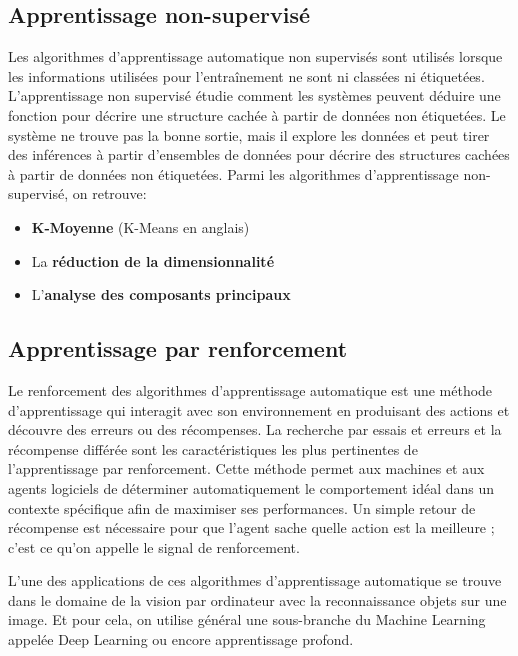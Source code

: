     \subsection{Apprentissage non-supervisé}
    Les algorithmes d'apprentissage automatique non supervisés sont utilisés lorsque les informations utilisées pour l'entraînement ne sont ni classées ni étiquetées. L'apprentissage non supervisé étudie comment les systèmes peuvent déduire une fonction pour décrire une structure cachée à partir de données non étiquetées. Le système ne trouve pas la bonne sortie, mais il explore les données et peut tirer des inférences à partir d'ensembles de données pour décrire des structures cachées à partir de données non étiquetées.\cite{expertAi}
    Parmi les algorithmes d'apprentissage non-supervisé, on retrouve:
        \begin{itemize}
            \item \textbf{K-Moyenne} (K-Means en anglais)
            \item La \textbf{réduction de la dimensionnalité}
            \item L'\textbf{analyse des composants principaux}
        \end{itemize}

    \subsection{Apprentissage par renforcement}
    Le renforcement des algorithmes d'apprentissage automatique est une méthode d'apprentissage qui interagit avec son environnement en produisant des actions et découvre des erreurs ou des récompenses. La recherche par essais et erreurs et la récompense différée sont les caractéristiques les plus pertinentes de l'apprentissage par renforcement. Cette méthode permet aux machines et aux agents logiciels de déterminer automatiquement le comportement idéal dans un contexte spécifique afin de maximiser ses performances. Un simple retour de récompense est nécessaire pour que l'agent sache quelle action est la meilleure ; c'est ce qu'on appelle le signal de renforcement.\cite{expertAi}




L’une des applications de ces algorithmes d'apprentissage automatique se trouve dans le domaine de la vision par ordinateur avec la reconnaissance objets sur une image. Et pour cela, on utilise général une sous-branche du Machine Learning appelée Deep Learning ou encore apprentissage profond.